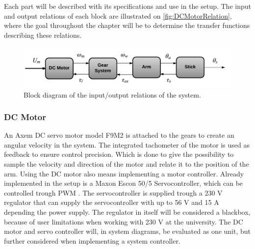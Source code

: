 \newpage
Each part will be described with its specifications and use in the setup. The input and output relations of each block are illustrated on \autoref{fig:DCMotorRelation}, where the goal throughout the chapter will be to determine the transfer functions describing these relations.

\begin{figure} [htbp]
	\centering
	\includegraphics[width=\textwidth]{figures/modeling/InputOutputSystem.pdf}
	\caption{Block diagram of the input/output relations of the system.} \label{fig:DCMotorRelation}
\end{figure}
\startexplain
\stopexplain

\subsubsection{DC Motor}\label{DCMotor}
An Axem DC servo motor model F9M2 is attached to the gears to create an angular velocity in the system. The integrated tachometer of the motor is used as feedback to ensure control precision. Which is done to give the possibility to sample the velocity and direction of the motor and relate it to the position of the arm. Using the DC motor also means implementing a motor controller. Already implemented in the setup is a Maxon Escon 50/5 Servocontroller, which can be controlled trough PWM \cite{datasheet:maxon}. The servocontroller is supplied trough a 230 V regulator that can supply the servocontroller with up to 56 V and 15 A depending the power supply. The regulator in itself will be considered a blackbox, because of user limitations when working with 230 V at the university. The DC motor and servo controller will, in system diagrams, be evaluated as one unit, but further considered when implementing a system controller. 

